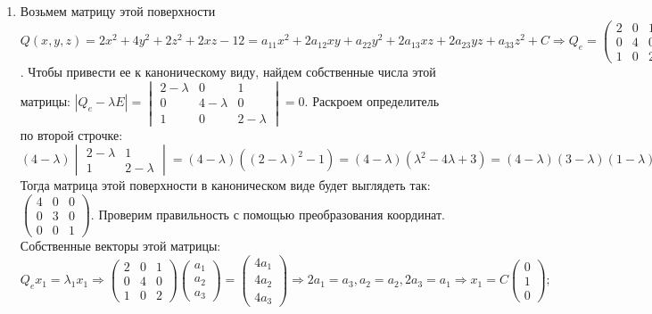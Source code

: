 \begin{enumerate}
	\item Возьмем матрицу этой поверхности $Q(x,y,z) = 2x^2 + 4y^2 + 2z^2 + 2xz - 12 = a_{11}x^2 + 2a_{12}xy + a_{22}y^2 + 2a_{13}xz + 2a_{23}yz + a_{33}z^2 + C \Rightarrow Q_e = \begin{pmatrix} 2 & 0 & 1 \\ 0 & 4 & 0 \\ 1 & 0 & 2 \end{pmatrix}$. 
Чтобы привести ее к каноническому виду, найдем собственные числа этой матрицы: $|Q_e - \lambda E| = \begin{vmatrix} 2 - \lambda & 0 & 1 \\ 0 & 4 - \lambda & 0 \\ 1 & 0 & 2 - \lambda  \end{vmatrix} = 0.$ Раскроем определитель по второй строчке: $(4 - \lambda) \begin{vmatrix} 2 - \lambda & 1 \\ 1 & 2 - \lambda \end{vmatrix} = (4 - \lambda)( (2 - \lambda)^2 - 1) = (4 - \lambda)(\lambda^2 -4\lambda + 3) = (4 - \lambda)(3 - \lambda)(1 - \lambda) = 0 \Rightarrow \lambda_1 = 4, \lambda_2 = 3, \lambda_3 = 1.$ \\
Тогда матрица этой поверхности в каноническом виде будет выглядеть так: $\begin{pmatrix} 4 & 0 & 0 \\ 0 & 3 & 0 \\ 0 & 0 & 1 \end{pmatrix}$. Проверим правильность с помощью преобразования координат. Собственные векторы этой матрицы: 
$Q_e x_1 = \lambda_1 x_1 \Rightarrow \begin{pmatrix} 2 & 0 & 1 \\ 0 & 4 & 0\\ 1 & 0 & 2 \end{pmatrix} \begin{pmatrix} a_1 \\ a_2 \\ a_3 \end{pmatrix} = \begin{pmatrix} 4a_1 \\ 4a_2 \\ 4a_3 \end{pmatrix}  \Rightarrow 2a_1 = a_3, a_2 = a_2, 2a_3 = a_1 \Rightarrow x_1 = C\begin{pmatrix} 0 \\ 1 \\ 0 \end{pmatrix};$

\end{enumerate}
